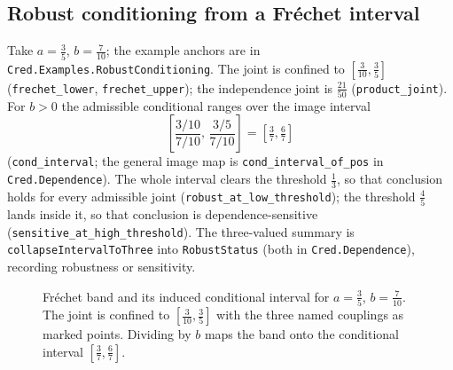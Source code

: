 \documentclass[11pt,a4paper]{article}
\newcommand{\cred}{\mathsf{cred}}
\newcommand{\Lean}[1]{\texttt{#1}}
\begin{document}
\subsection{Robust conditioning from a Fr\'echet interval}
Take $a=\tfrac35$, $b=\tfrac{7}{10}$; the example anchors are in
\texttt{Cred.Examples.RobustConditioning}.  The joint is confined to
$[\tfrac{3}{10},\tfrac35]$ (\Lean{frechet\_lower},
\Lean{frechet\_upper}); the independence joint is $\tfrac{21}{50}$
(\Lean{product\_joint}).  For $b>0$ the admissible conditional ranges
over the image interval
\[
  \left[\frac{3/10}{7/10},\,\frac{3/5}{7/10}\right]
  =\left[\tfrac37,\tfrac67\right]
\]
(\Lean{cond\_interval}; the general image map is
\Lean{cond\_interval\_of\_pos} in \texttt{Cred.Dependence}).  The whole
interval clears the threshold $\tfrac13$, so that conclusion holds for
every admissible joint (\Lean{robust\_at\_low\_threshold}); the threshold
$\tfrac45$ lands inside it, so that conclusion is dependence-sensitive
(\Lean{sensitive\_at\_high\_threshold}).  The three-valued summary is
\Lean{collapseIntervalToThree} into \Lean{RobustStatus} (both in
\texttt{Cred.Dependence}), recording robustness or sensitivity.

\begin{figure}[h]
\centering
{}
\caption{Fr\'echet band and its induced conditional interval for
$a=\tfrac35$, $b=\tfrac{7}{10}$.  The joint is confined to
$[\tfrac{3}{10},\tfrac35]$ with the three named couplings as marked
points.  Dividing by $b$ maps the band onto the conditional interval
$[\tfrac37,\tfrac67]$.}
\label{fig:frechet-interval}
\end{figure}
\end{document}

